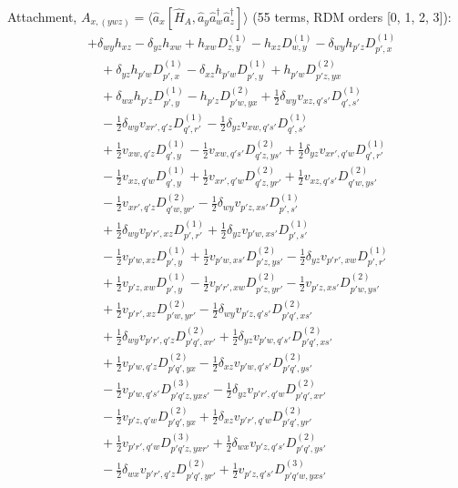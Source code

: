 \noindent Attachment, $A_{x,(ywz)}=\langle \hat a_x[\hat H_A,\hat a_y\hat a_w^\dagger \hat a_z^\dagger]\rangle$ (55 terms, RDM orders [0, 1, 2, 3]):
\begin{align*}
&+\delta_{wy}h_{xz}-\delta_{yz}h_{xw}+h_{xw}D^{(1)}_{z,y}-h_{xz}D^{(1)}_{w,y}-\delta_{wy}h_{p'z}D^{(1)}_{p',x} \\
&\quad +\delta_{yz}h_{p'w}D^{(1)}_{p',x}-\delta_{xz}h_{p'w}D^{(1)}_{p',y}+h_{p'w}D^{(2)}_{p'z,yx} \\
&\quad +\delta_{wx}h_{p'z}D^{(1)}_{p',y}-h_{p'z}D^{(2)}_{p'w,yx}+\tfrac12\delta_{wy}v_{xz,q's'}D^{(1)}_{q',s'} \\
&\quad -\tfrac12\delta_{wy}v_{xr',q'z}D^{(1)}_{q',r'}-\tfrac12\delta_{yz}v_{xw,q's'}D^{(1)}_{q',s'} \\
&\quad +\tfrac12v_{xw,q'z}D^{(1)}_{q',y}-\tfrac12v_{xw,q's'}D^{(2)}_{q'z,ys'}+\tfrac12\delta_{yz}v_{xr',q'w}D^{(1)}_{q',r'} \\
&\quad -\tfrac12v_{xz,q'w}D^{(1)}_{q',y}+\tfrac12v_{xr',q'w}D^{(2)}_{q'z,yr'}+\tfrac12v_{xz,q's'}D^{(2)}_{q'w,ys'} \\
&\quad -\tfrac12v_{xr',q'z}D^{(2)}_{q'w,yr'}-\tfrac12\delta_{wy}v_{p'z,xs'}D^{(1)}_{p',s'} \\
&\quad +\tfrac12\delta_{wy}v_{p'r',xz}D^{(1)}_{p',r'}+\tfrac12\delta_{yz}v_{p'w,xs'}D^{(1)}_{p',s'} \\
&\quad -\tfrac12v_{p'w,xz}D^{(1)}_{p',y}+\tfrac12v_{p'w,xs'}D^{(2)}_{p'z,ys'}-\tfrac12\delta_{yz}v_{p'r',xw}D^{(1)}_{p',r'} \\
&\quad +\tfrac12v_{p'z,xw}D^{(1)}_{p',y}-\tfrac12v_{p'r',xw}D^{(2)}_{p'z,yr'}-\tfrac12v_{p'z,xs'}D^{(2)}_{p'w,ys'} \\
&\quad +\tfrac12v_{p'r',xz}D^{(2)}_{p'w,yr'}-\tfrac12\delta_{wy}v_{p'z,q's'}D^{(2)}_{p'q',xs'} \\
&\quad +\tfrac12\delta_{wy}v_{p'r',q'z}D^{(2)}_{p'q',xr'}+\tfrac12\delta_{yz}v_{p'w,q's'}D^{(2)}_{p'q',xs'} \\
&\quad +\tfrac12v_{p'w,q'z}D^{(2)}_{p'q',yx}-\tfrac12\delta_{xz}v_{p'w,q's'}D^{(2)}_{p'q',ys'} \\
&\quad -\tfrac12v_{p'w,q's'}D^{(3)}_{p'q'z,yxs'}-\tfrac12\delta_{yz}v_{p'r',q'w}D^{(2)}_{p'q',xr'} \\
&\quad -\tfrac12v_{p'z,q'w}D^{(2)}_{p'q',yx}+\tfrac12\delta_{xz}v_{p'r',q'w}D^{(2)}_{p'q',yr'} \\
&\quad +\tfrac12v_{p'r',q'w}D^{(3)}_{p'q'z,yxr'}+\tfrac12\delta_{wx}v_{p'z,q's'}D^{(2)}_{p'q',ys'} \\
&\quad -\tfrac12\delta_{wx}v_{p'r',q'z}D^{(2)}_{p'q',yr'}+\tfrac12v_{p'z,q's'}D^{(3)}_{p'q'w,yxs'} \\

\end{align*}
